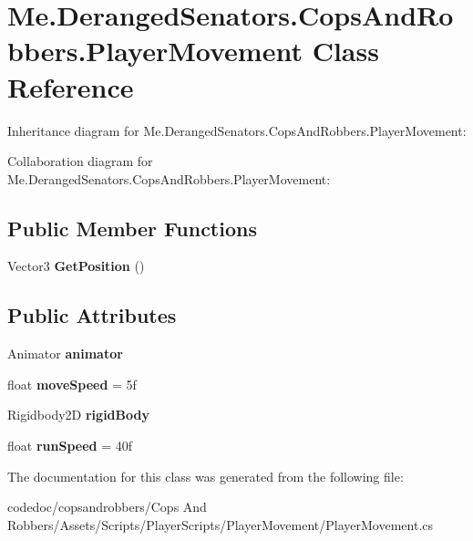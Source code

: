 \hypertarget{classMe_1_1DerangedSenators_1_1CopsAndRobbers_1_1PlayerMovement}{}\section{Me.\+Deranged\+Senators.\+Cops\+And\+Robbers.\+Player\+Movement Class Reference}
\label{classMe_1_1DerangedSenators_1_1CopsAndRobbers_1_1PlayerMovement}


Inheritance diagram for Me.\+Deranged\+Senators.\+Cops\+And\+Robbers.\+Player\+Movement\+:


Collaboration diagram for Me.\+Deranged\+Senators.\+Cops\+And\+Robbers.\+Player\+Movement\+:
\subsection*{Public Member Functions}
\begin{DoxyCompactItemize}
\item 
\mbox{\label{classMe_1_1DerangedSenators_1_1CopsAndRobbers_1_1PlayerMovement_a62676b2b68e537ef6951bb90e77b1864}} 
Vector3 {\bfseries Get\+Position} ()
\end{DoxyCompactItemize}
\subsection*{Public Attributes}
\begin{DoxyCompactItemize}
\item 
\mbox{\label{classMe_1_1DerangedSenators_1_1CopsAndRobbers_1_1PlayerMovement_a79ac0fe8706d69ba753e0984e1089e7c}} 
Animator {\bfseries animator}
\item 
\mbox{\label{classMe_1_1DerangedSenators_1_1CopsAndRobbers_1_1PlayerMovement_ab696bca03546210e9990d57670664730}} 
float {\bfseries move\+Speed} = 5f
\item 
\mbox{\label{classMe_1_1DerangedSenators_1_1CopsAndRobbers_1_1PlayerMovement_a0cbcc75691526e1f8c366da3feb04af1}} 
Rigidbody2D {\bfseries rigid\+Body}
\item 
\mbox{\label{classMe_1_1DerangedSenators_1_1CopsAndRobbers_1_1PlayerMovement_ac80570a0d4b0be8cc8bb34f9e824bb0d}} 
float {\bfseries run\+Speed} = 40f
\end{DoxyCompactItemize}


The documentation for this class was generated from the following file\+:\begin{DoxyCompactItemize}
\item 
codedoc/copsandrobbers/\+Cops And Robbers/\+Assets/\+Scripts/\+Player\+Scripts/\+Player\+Movement/Player\+Movement.\+cs\end{DoxyCompactItemize}
